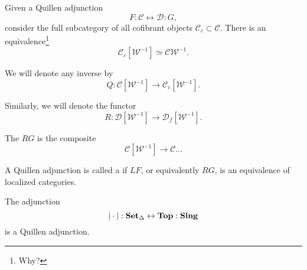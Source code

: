 \documentclass[main.tex]{subfiles}
\begin{document}
Given a Quillen adjunction
\begin{equation*}
  F : \mathcal{C} \leftrightarrow \mathcal{D} : G,
\end{equation*}
consider the full subcategory of all cofibrant objects $\mathcal{C}_{c} \subset \mathcal{C}$. There is an equivalence\footnote{Why?}
\begin{equation*}
  \mathcal{C}_{c}[\mathcal{W}^{-1}] \simeq \mathcal{C}{\mathcal{W}^{-1}}.
\end{equation*}

We will denote any inverse by
\begin{equation*}
  Q\colon \mathcal{C}[\mathcal{W}^{-1}] \to \mathcal{C}_{c}[\mathcal{W}^{-1}].
\end{equation*}

Similarly, we will denote the functor
\begin{equation*}
  R\colon \mathcal{D}[\mathcal{W}^{-1}] \to \mathcal{D}_{f}[\mathcal{W}^{-1}].
\end{equation*}

\begin{definition}
  \label{def:left_derived_functor}
  The  $RG$ is the composite
  \begin{equation*}
    \mathcal{C}[\mathcal{W}^{-1}] \to \mathcal{C}\ldots
  \end{equation*}
\end{definition}

\begin{definition}
  \label{def:quillen_equivalence}
  A Quillen adjunction is called a  if $LF$, or equivalently $RG$, is an equivalence of localized categories.
\end{definition}

\begin{theorem}
  The adjunction
  \begin{equation*}
    {| \cdot |} : \operatorname{\mathbf{Set}_{\Delta}} \leftrightarrow \mathbf{Top} : \mathbf{Sing}
  \end{equation*}
  is a Quillen adjunction.
\end{theorem}
\end{document}
